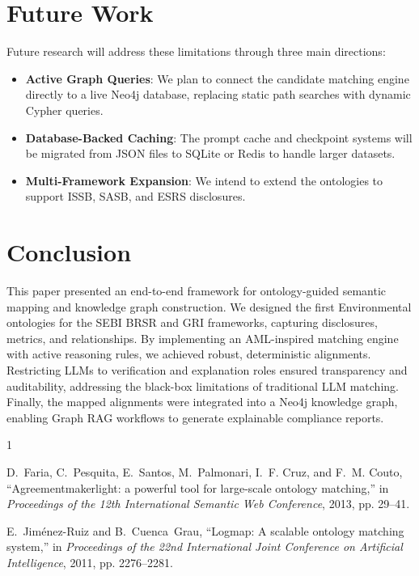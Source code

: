 \documentclass[journal,compsoc]{IEEEtran}
\begin{document}
\begin{itemize}
\begin{table}[t]
\begin{itemize}
\begin{table}[t]
\section{Future Work}
Future research will address these limitations through three main directions:
\begin{itemize}
    \item \textbf{Active Graph Queries}: We plan to connect the candidate matching engine directly to a live Neo4j database, replacing static path searches with dynamic Cypher queries.
    \item \textbf{Database-Backed Caching}: The prompt cache and checkpoint systems will be migrated from JSON files to SQLite or Redis to handle larger datasets.
    \item \textbf{Multi-Framework Expansion}: We intend to extend the ontologies to support ISSB, SASB, and ESRS disclosures.
\end{itemize}

\section{Conclusion}
This paper presented an end-to-end framework for ontology-guided semantic mapping and knowledge graph construction. We designed the first Environmental ontologies for the SEBI BRSR and GRI frameworks, capturing disclosures, metrics, and relationships. By implementing an AML-inspired matching engine with active reasoning rules, we achieved robust, deterministic alignments. Restricting LLMs to verification and explanation roles ensured transparency and auditability, addressing the black-box limitations of traditional LLM matching. Finally, the mapped alignments were integrated into a Neo4j knowledge graph, enabling Graph RAG workflows to generate explainable compliance reports.


\begin{thebibliography}{1}

D.~Faria, C.~Pesquita, E.~Santos, M.~Palmonari, I.~F. Cruz, and F.~M. Couto,
  ``Agreementmakerlight: a powerful tool for large-scale ontology matching,''
  in \emph{Proceedings of the 12th International Semantic Web Conference},
  2013, pp. 29--41.

E.~Jim{\'e}nez-Ruiz and B.~Cuenca~Grau, ``Logmap: A scalable ontology matching
  system,'' in \emph{Proceedings of the 22nd International Joint Conference on
  Artificial Intelligence}, 2011, pp. 2276--2281.


\end{thebibliography}
\end{table}
\end{itemize}
\end{table}
\end{itemize}
\end{document}
